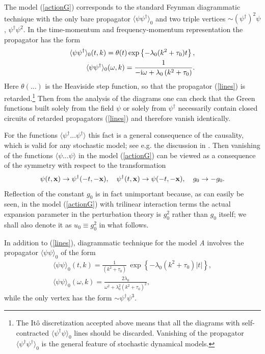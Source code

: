 \documentclass[12pt]{article}
\begin{document}
The model (\ref{actionG}) corresponds to the standard Feynman
diagrammatic technique with the only bare propagator
$\langle \psi \psi^{\dag} \rangle_{0}$ and two triple vertices
$\sim (\psi^{\dagger})^2\psi$, $\psi^{\dagger}\psi^2$.
In the time-momentum and frequency-momentum representation the propagator
has the form
\begin{eqnarray}
\langle \psi \psi^{\dag} \rangle_{0}(t,k) =
\theta(t) \exp \left\{ - \lambda_{0}
(k^{2}+\tau_{0}) t \right\}, \nonumber \\
\langle \psi \psi^{\dag} \rangle_{0} (\omega,k) =
\frac{1}{-{\rm i}\omega+\lambda_{0} \left(k^{2}+\tau_{0}\right)}.
\label{lines}
\end{eqnarray}
Here $\theta(\dots)$ is the Heaviside step function, so that the propagator
(\ref{lines}) is retarded.\footnote{The It\^{o} discretization
accepted above means that all the diagrams with self-contracted
$\langle \psi^{\dag} \psi \rangle_{0}$ lines should be discarded.
Vanishing of the propagator $\langle \psi^{\dag} \psi^{\dag} \rangle_{0}$
is the general feature of stochastic dynamical models.}
Then from the analysis of the diagrams one can
check that the Green functions built solely from the field $\psi$
or solely from $\psi^{\dag}$ necessarily contain closed circuits of
retarded propagators (\ref{lines}) and therefore vanish identically.

For the functions $\langle \psi^{\dag} \dots \psi^{\dag} \rangle$ this
fact is a general consequence of the causality, which is valid
for any stochastic model; see e.g. the discussion in \cite{Book3}.
Then vanishing of the functions $\langle \psi \dots \psi \rangle$
in the model (\ref{actionG}) can be viewed as a consequence of the
symmetry with respect to the transformation
\begin{equation}
\psi(t,{\bf x})\to \psi^{\dagger}(-t,-{\bf x}),
\quad \psi^{\dagger}(t,{\bf x})\to \psi(-t,-{\bf x}),
\quad g_{0}\to -g_{0}.
\label{symm}
\end{equation}
Reflection of the constant $g_{0}$ is in fact unimportant because, as can
easily be seen, in the model (\ref{actionG}) with trilinear interaction
terms the actual expansion parameter in the perturbation theory is
$g_{0}^{2}$ rather than $g_{0}$ itself; we shall also denote it as
$u_{0}\equiv g_{0}^{2}$ in what follows.

In addition to (\ref{lines}), diagrammatic technique for the model {\it A}
involves the propagator $\langle \psi \psi \rangle_{0}$ of the form
\begin{eqnarray}
\langle \psi \psi \rangle_{0}(t,k) = \frac{1}{(k^{2}+\tau_{0})}\,
\exp \left\{ - \lambda_{0} (k^{2}+\tau_{0})|t| \right\},
\nonumber \\
\langle \psi \psi \rangle_{0}(\omega,k) = \frac{2\lambda_{0}}
{\omega^{2} + \lambda_{0}^{2} (k^{2}+\tau_{0})^{2}},
\label{lines2}
\end{eqnarray}
while the only vertex has the form $\sim \psi^{\dagger}\psi^{3}$.
\end{document}
